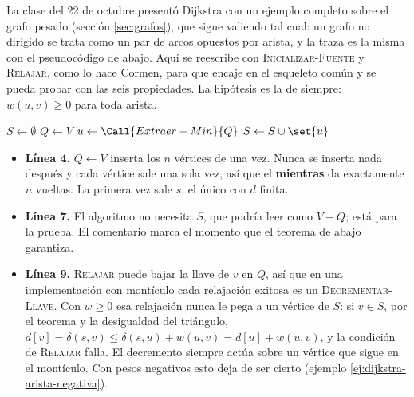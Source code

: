 \documentclass[11pt,letterpaper]{article}
\begin{document}
La clase del 22 de octubre presentó Dijkstra con un ejemplo completo
sobre el grafo pesado (sección \ref{sec:grafos}), que sigue valiendo
tal cual: un grafo no dirigido se trata como un par de arcos opuestos
por arista, y la traza es la misma con el pseudocódigo de abajo. Aquí
se reescribe con \textsc{Inicializar-Fuente} y \textsc{Relajar}, como
lo hace Cormen, para que encaje en el esqueleto común y se pueda
probar con las seis propiedades. La hipótesis es la de siempre:
$w(u, v) \ge 0$ para toda arista.

\begin{algorithm}[H]
\caption{\textsc{Dijkstra}$(G, w, s)$, versión de Cormen}
\label{alg:dijkstra-cormen}
\begin{algorithmic}[1]
  \State {}
  \State $S \gets \emptyset$
  \State $Q \gets V$ 
    \State $u \gets \Call{Extraer-Min}{Q}$
    \State $S \gets S \cup \set{u}$ 
      \State {} 
    \EndFor
  \EndWhile
\EndProcedure
\end{algorithmic}
\end{algorithm}

\begin{itemize}[itemsep=0.1em]
  \item \textbf{Línea 4.} $Q \gets V$ inserta los $n$ vértices de una
        vez. Nunca se inserta nada después y cada vértice sale una
        sola vez, así que el \textbf{mientras} da exactamente $n$
        vueltas. La primera vez sale $s$, el único con $d$ finita.
  \item \textbf{Línea 7.} El algoritmo no necesita $S$, que podría
        leer como $V - Q$; está para la prueba. El comentario marca el
        momento que el teorema de abajo garantiza.
  \item \textbf{Línea 9.} \textsc{Relajar} puede bajar la llave de
        $v$ en $Q$, así que en una implementación con montículo cada
        relajación exitosa es un \textsc{Decrementar-Llave}. Con
        $w \ge 0$ esa relajación nunca le pega a un vértice de $S$: si
        $v \in S$, por el teorema y la desigualdad del triángulo,
        $d[v] = \delta(s, v) \le \delta(s, u) + w(u, v)
        = d[u] + w(u, v)$, y la condición de \textsc{Relajar} falla.
        El decremento siempre actúa sobre un vértice que sigue en el
        montículo. Con pesos negativos esto deja de ser cierto
        (ejemplo \ref{ej:dijkstra-arista-negativa}).
\end{itemize}
\end{document}
